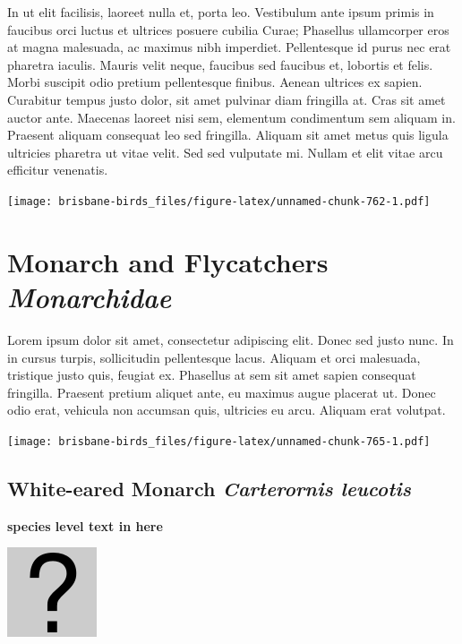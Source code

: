 \documentclass[]{book}
\let\origfigure\figure
\let\endorigfigure\endfigure
\renewenvironment{figure}[1][2] {
  \expandafter\origfigure\expandafter[H]
} {
  \endorigfigure
}
\begin{document}
In ut elit facilisis, laoreet nulla et, porta leo. Vestibulum ante ipsum
primis in faucibus orci luctus et ultrices posuere cubilia Curae;
Phasellus ullamcorper eros at magna malesuada, ac maximus nibh
imperdiet. Pellentesque id purus nec erat pharetra iaculis. Mauris velit
neque, faucibus sed faucibus et, lobortis et felis. Morbi suscipit odio
pretium pellentesque finibus. Aenean ultrices ex sapien. Curabitur
tempus justo dolor, sit amet pulvinar diam fringilla at. Cras sit amet
auctor ante. Maecenas laoreet nisi sem, elementum condimentum sem
aliquam in. Praesent aliquam consequat leo sed fringilla. Aliquam sit
amet metus quis ligula ultricies pharetra ut vitae velit. Sed sed
vulputate mi. Nullam et elit vitae arcu efficitur venenatis.

\begin{figure}
\centering
\texttt{[image: brisbane-birds\_files/figure-latex/unnamed-chunk-762-1.pdf]}
\caption{\label{fig:unnamed-chunk-762}insert figure caption}
\end{figure}

\chapter{\texorpdfstring{Monarch and Flycatchers
\emph{Monarchidae}}{Monarch and Flycatchers Monarchidae}}\label{monarch-and-flycatchers-monarchidae}

Lorem ipsum dolor sit amet, consectetur adipiscing elit. Donec sed justo
nunc. In in cursus turpis, sollicitudin pellentesque lacus. Aliquam et
orci malesuada, tristique justo quis, feugiat ex. Phasellus at sem sit
amet sapien consequat fringilla. Praesent pretium aliquet ante, eu
maximus augue placerat ut. Donec odio erat, vehicula non accumsan quis,
ultricies eu arcu. Aliquam erat volutpat.

\texttt{[image: brisbane-birds\_files/figure-latex/unnamed-chunk-765-1.pdf]}

\section{\texorpdfstring{White-eared Monarch \emph{Carterornis
leucotis}}{White-eared Monarch Carterornis leucotis}}\label{white-eared-monarch-carterornis-leucotis}

\textbf{species level text in here}

\begin{figure}
\centering
\includegraphics{assets/missing.png}
\caption{No image for species}
\end{figure}
\end{document}
